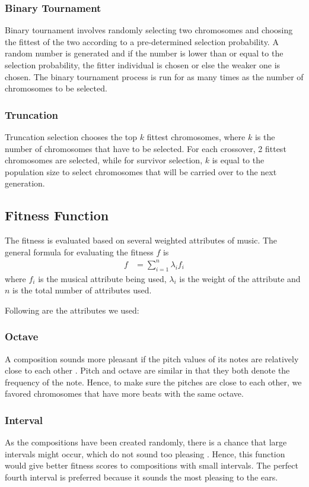 \documentclass[conference]{IEEEtran}
\begin{document}
\subsubsection{Binary Tournament}
Binary tournament involves randomly selecting two chromosomes and choosing the fittest of the two according to a pre-determined selection probability. A random number is generated and if the number is lower than or equal to the selection probability, the fitter individual is chosen or else the weaker one is chosen. The binary tournament process is run for as many times as the number of chromosomes to be selected.

\subsubsection{Truncation}
Truncation selection chooses the top $k$ fittest chromosomes, where $k$ is the number of chromosomes that have to be selected. For each crossover, 2 fittest chromosomes are selected, while for survivor selection, $k$ is equal to the population size to select chromosomes that will be carried over to the next generation.

\subsection{Fitness Function}
The fitness is evaluated based on several weighted attributes of music. The general formula for evaluating the fitness $f$ is
\begin{align*}
f &= \sum_{i=1}^{n} \lambda_{i}f_{i}
\end{align*}
where $f_{i}$ is the musical attribute being used, $\lambda_{i}$ is the weight of the attribute and $n$ is the total number of attributes used.

Following are the attributes we used:

\subsubsection{Octave}
A composition sounds more pleasant if the pitch values of its notes are relatively close to each other \cite{b2}. Pitch and octave are similar in that they both denote the frequency of the note. Hence, to make sure the pitches are close to each other, we favored chromosomes that have more beats with the same octave.

\subsubsection{Interval}
As the compositions have been created randomly, there is a chance that large intervals might occur, which do not sound too pleasing \cite{b6}. Hence, this function would give better fitness scores to compositions with small intervals. The perfect fourth interval is preferred \cite{b4} because it sounds the most pleasing to the ears.
\end{document}
